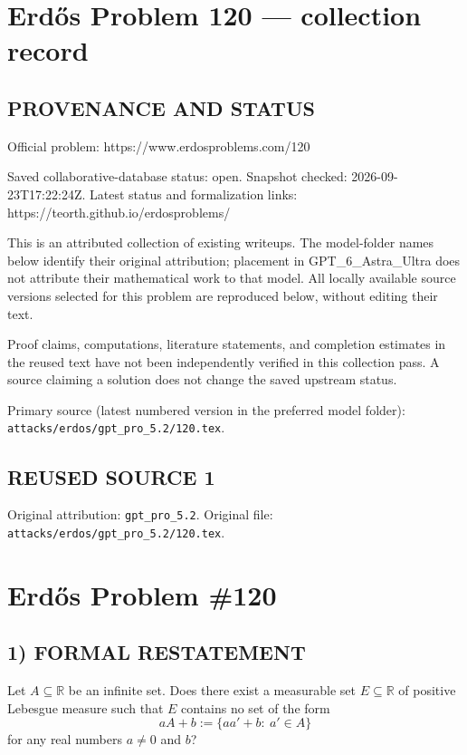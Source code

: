 \section*{Erd\H{o}s Problem 120 --- collection record}

\subsection*{PROVENANCE AND STATUS}
Official problem: https://www.erdosproblems.com/120

Saved collaborative-database status: open.
Snapshot checked: 2026-09-23T17:22:24Z.
Latest status and formalization links: https://teorth.github.io/erdosproblems/

This is an attributed collection of existing writeups. The model-folder names below identify their original attribution; placement in GPT\_6\_Astra\_Ultra does not attribute their mathematical work to that model. All locally available source versions selected for this problem are reproduced below, without editing their text.

Proof claims, computations, literature statements, and completion estimates in the reused text have not been independently verified in this collection pass. A source claiming a solution does not change the saved upstream status.

Primary source (latest numbered version in the preferred model folder): \texttt{attacks/erdos/gpt\_pro\_5.2/120.tex}.

\subsection*{REUSED SOURCE 1}
Original attribution: \texttt{gpt\_pro\_5.2}.
Original file: \texttt{attacks/erdos/gpt\_pro\_5.2/120.tex}.


\section*{Erd\H{o}s Problem \#120}

\subsection*{1) FORMAL RESTATEMENT}
Let $A\subseteq\mathbb R$ be an infinite set.  Does there exist a measurable set $E\subseteq\mathbb R$ of positive Lebesgue measure such that $E$ contains no set of the form
\[
aA+b:=\{aa'+b:\ a'\in A\}
\]
for any real numbers $a\neq0$ and $b$?

